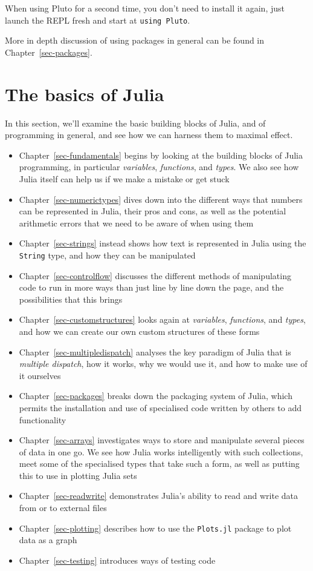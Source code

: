 \documentclass[
  letterpaper,
  DIV=11,
  numbers=noendperiod]{scrreprt}
\begin{document}
When using Pluto for a second time, you don't need to install it again,
just launch the REPL fresh and start at \texttt{using\ Pluto}.

More in depth discussion of using packages in general can be found in
Chapter~\ref{sec-packages}.

\part{The basics of Julia}

In this section, we'll examine the basic building blocks of Julia, and
of programming in general, and see how we can harness them to maximal
effect.

\begin{itemize}
\item
  Chapter~\ref{sec-fundamentals} begins by looking at the building
  blocks of Julia programming, in particular \emph{variables},
  \emph{functions}, and \emph{types}. We also see how Julia itself can
  help us if we make a mistake or get stuck
\item
  Chapter~\ref{sec-numerictypes} dives down into the different ways that
  numbers can be represented in Julia, their pros and cons, as well as
  the potential arithmetic errors that we need to be aware of when using
  them
\item
  Chapter~\ref{sec-strings} instead shows how text is represented in
  Julia using the \texttt{String} type, and how they can be manipulated
\item
  Chapter~\ref{sec-controlflow} discusses the different methods of
  manipulating code to run in more ways than just line by line down the
  page, and the possibilities that this brings
\item
  Chapter~\ref{sec-customstructures} looks again at \emph{variables},
  \emph{functions}, and \emph{types}, and how we can create our own
  custom structures of these forms
\item
  Chapter~\ref{sec-multipledispatch} analyses the key paradigm of Julia
  that is \emph{multiple dispatch}, how it works, why we would use it,
  and how to make use of it ourselves
\item
  Chapter~\ref{sec-packages} breaks down the packaging system of Julia,
  which permits the installation and use of specialised code written by
  others to add functionality
\item
  Chapter~\ref{sec-arrays} investigates ways to store and manipulate
  several pieces of data in one go. We see how Julia works intelligently
  with such collections, meet some of the specialised types that take
  such a form, as well as putting this to use in plotting Julia sets
\item
  Chapter~\ref{sec-readwrite} demonstrates Julia's ability to read and
  write data from or to external files
\item
  Chapter~\ref{sec-plotting} describes how to use the \texttt{Plots.jl}
  package to plot data as a graph
\item
  Chapter~\ref{sec-testing} introduces ways of testing code
\end{itemize}
\end{document}
